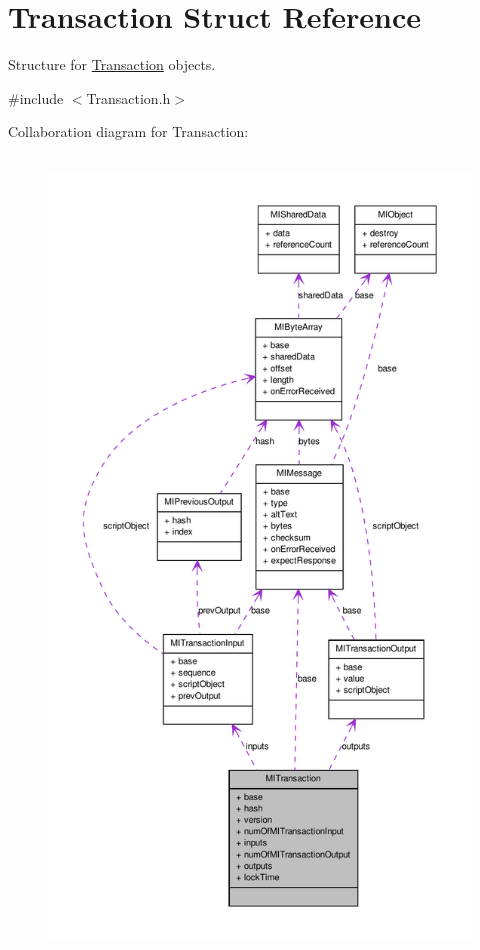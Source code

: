 \hypertarget{struct_m_i_transaction}{
\section{Transaction Struct Reference}
\label{struct_m_i_transaction}
}


Structure for \hyperlink{struct_m_i_transaction}{Transaction} objects.  




{\ttfamily \#include $<$Transaction.h$>$}



Collaboration diagram for Transaction:
\nopagebreak
\begin{figure}[H]
\begin{center}
\leavevmode
\includegraphics[height=600pt]{struct_m_i_transaction__coll__graph}
\end{center}
\end{figure}
